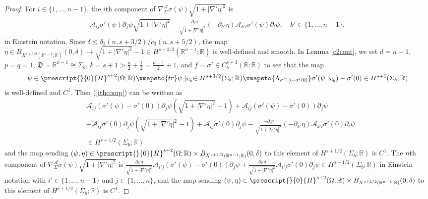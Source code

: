 \documentclass[11pt,letterpaper,reqno]{amsart}
\numberwithin{equation}{section}
\newcommand{\abs}[1]{\left\lvert#1\right\rvert}
\begin{document}
\begin{proof}
    For \(i \in \{1, \dots, n-1\}\), the \(i\)th component of \(\nabla_{\Sigma}^{\mathcal{A}}\sigma(\psi)\sqrt{1+\abs{\nabla'\eta}^{2}}\) is
    \begin{align} \label{ithcomp}
        \mathcal{A}_{ij}\sigma'(\psi)\partial_{j}\psi\sqrt{1+\abs{\nabla'\eta}^{2}}-\frac{-\partial_{i}\eta}{\sqrt{1+\abs{\nabla'\eta}^{2}}}(-\partial_{k'}\eta)\mathcal{A}_{k' l}\sigma'(\psi)\partial_{l}\psi, \quad k' \in \{1, \dots, n-1\},
    \end{align}
    in Einstein notation. Since \(\delta \leq \delta_{3}(n,s+3/2)/c_{3}(n,s+5/2)\), the map \(\eta \in B_{X^{s+5/2}(\mathbb{R}^{n-1};\mathbb{R})}(0,\delta) \mapsto \sqrt{1+\abs{\nabla'\eta}^{2}}-1 \in H^{s+3/2}(\mathbb{R}^{n-1};\mathbb{R})\) is well-defined and smooth. In Lemma \ref{c2cont}, we set \(d=n-1\), \(p=q=1\), \(\mathfrak{D}=\mathbb{R}^{n-1}\cong\Sigma_{b}\), \(k=s+1>\frac{n}{2}+\frac{1}{2}=\frac{n-1}{2}+1\), and \(f=\sigma' \in C_{b}^{s+3}(\mathbb{R};\mathbb{R})\) to see that the map
    \begin{align}
        \psi \in \prescript{}{0}{H}^{s+2}(\Omega;\mathbb{R}) \xmapsto{tr} \psi \mid_{\Sigma_{b}} \in H^{s+3/2}(\Sigma_{b};\mathbb{R}) \xmapsto{\Lambda_{\sigma'(\cdot)-\sigma'(0)}} \sigma'(\psi \mid_{\Sigma_{b}})-\sigma'(0) \in H^{s+1}(\Sigma_{b};\mathbb{R})
    \end{align}
    is well-defined and \(C^{1}\). Then (\ref{ithcomp}) can be written as
    \begin{align}
        &\mathcal{A}_{ij}(\sigma'(\psi)-\sigma'(0))\partial_{j}\psi(\sqrt{1+\abs{\nabla'\eta}^{2}}-1)+\mathcal{A}_{ij}(\sigma'(\psi)-\sigma'(0))\partial_{j}\psi  \nonumber\\
        &+\mathcal{A}_{ij}\sigma'(0)\partial_{j}\psi(\sqrt{1+\abs{\nabla'\eta}^{2}}-1)+\mathcal{A}_{ij}\sigma'(0)\partial_{j}\psi-\frac{-\partial_{i}\eta}{\sqrt{1+\abs{\nabla'\eta}^{2}}}(-\partial_{k'}\eta)\mathcal{A}_{k' l}\sigma'(0)\partial_{l}\psi \nonumber \\
        &\in H^{s+1/2}(\Sigma_{b};\mathbb{R})
    \end{align}
    and the map sending \((\psi,\eta) \in \prescript{}{0}{H}^{s+2}(\Omega;\mathbb{R}) \times B_{X^{s+5/2}(\mathbb{R}^{n-1};\mathbb{R})}(0,\delta)\) to this element of \(H^{s+1/2}(\Sigma_{b};\mathbb{R})\) is \(C^{1}\). The \(n\)th component of \(\nabla_{\Sigma}^{\mathcal{A}}\sigma(\psi)\sqrt{1+\abs{\nabla'\eta}^{2}}\) is \(\frac{\partial_{i'}\eta}{\sqrt{1+\abs{\nabla'\eta}^{2}}}\mathcal{A}_{i'j}(\sigma'(\psi)-\sigma'(0))\partial_{j}\psi+\frac{\partial_{i'}\eta}{\sqrt{1+\abs{\nabla'\eta}^{2}}}\mathcal{A}_{i'j}\sigma'(0)\partial_{j}\psi \in H^{s+1/2}(\Sigma_{b};\mathbb{R})\) in Einstein notation with \(i' \in \{1, \dots, n-1\}\) and \(j \in \{1, \dots, n\}\), and the map sending \((\psi,\eta) \in \prescript{}{0}{H}^{s+2}(\Omega;\mathbb{R}) \times B_{X^{s+5/2}(\mathbb{R}^{n-1};\mathbb{R})}(0,\delta)\) to this element of \(H^{s+1/2}(\Sigma_{b};\mathbb{R})\) is \(C^{1}\).


\end{proof}
\end{document}
